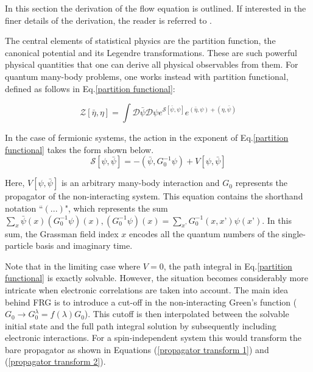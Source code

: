 \documentclass[12pt]{article}
\begin{document}
In this section the derivation of the flow equation is outlined. 
If interested in the finer details of the derivation, the reader is referred to \cite{metzner2012functional}. \par
\medskip
\noindent The central elements of statistical physics are the partition function, the canonical potential and its Legendre transformations. 
These are such powerful physical quantities that one can derive all physical observables from them.
For quantum many-body problems, one works instead with partition functional, defined as follows in Eq.\ref{partition functional}:

\begin{equation}\label{partition functional}
    \mathcal{Z}[\bar{\eta}, \eta] = \int \mathcal{D} \bar{\psi} \mathcal{D}\psi e^{\mathcal{S}[\bar{\psi}, \psi]}e^{(\bar{\eta}, \psi)+(\eta, \bar{\psi})}
\end{equation}

\noindent In the case of fermionic systems, the action in the exponent of Eq.\ref{partition functional} takes the form shown below.
\begin{equation} \label{action}
    \mathcal{S}[\psi, \bar{\psi}] = -(\bar{\psi}, G_0^{-1} \psi) + V[\psi, \bar{\psi}]
\end{equation}

\noindent Here, $V[\psi, \bar{\psi}]$ is an arbitrary many-body interaction and $G_0$ represents the propagator of the non-interacting system. 
This equation contains the shorthand notation ``$(...)$", which represents the sum $\sum_x \bar{\psi}(x)(G_0^{-1}\psi)(x), (G_0^{-1}\psi)(x) = \sum_{x’}G_0^{-1}(x,x’)\psi(x’)$. In this sum, the Grassman field index $x$ encodes all the quantum numbers of the single-particle basis and imaginary time.\par
\medskip

\noindent Note that in the limiting case where $V=0$, the path integral in Eq.\ref{partition functional} is exactly solvable. 
However, the situation becomes considerably more intricate when electronic correlations are taken into account.
The main idea behind FRG is to introduce a cut-off in the non-interacting Green's function ($G_0 \rightarrow G_0^{\lambda} = f(\lambda)G_0$). 
This cutoff is then interpolated between the solvable initial state and the full path integral solution by subsequently including electronic interactions. For a spin-independent system this would transform the 
bare propagator as shown in Equations (\ref{propagator transform 1}) and (\ref{propagator transform 2}). 
\end{document}
